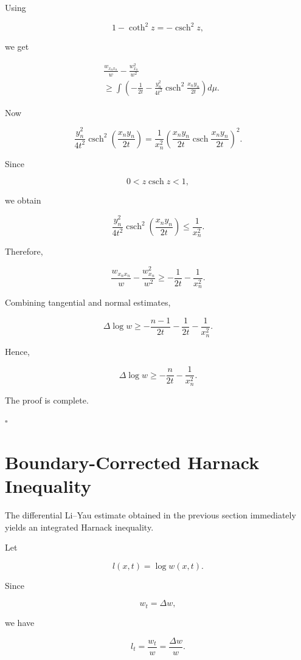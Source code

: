 \documentclass[10pt,a4paper]{amsart}
\DeclareMathOperator{\csch}{csch}
\begin{document}
Using

\[
1-\coth^2 z
=
-\csch^2 z ,
\]

we get

\[
\begin{aligned}
&
\frac{w_{x_nx_n}}w
-
\frac{w_{x_n}^2}{w^2}
\\
&\geq
\int
\left(
-\frac1{2t}
-
\frac{y_n^2}{4t^2}
\csch^2
\frac{x_ny_n}{2t}
\right)d\mu .
\end{aligned}
\]

Now

\[
\frac{y_n^2}{4t^2}
\csch^2
\left(
\frac{x_ny_n}{2t}
\right)
=
\frac1{x_n^2}
\left(
\frac{x_ny_n}{2t}
\csch
\frac{x_ny_n}{2t}
\right)^2 .
\]


Since

\[
0<z\csch z<1,
\]

we obtain

\[
\frac{y_n^2}{4t^2}
\csch^2
\left(
\frac{x_ny_n}{2t}
\right)
\leq
\frac1{x_n^2}.
\]


Therefore,

\[
\frac{w_{x_nx_n}}w
-
\frac{w_{x_n}^2}{w^2}
\geq
-\frac1{2t}
-\frac1{x_n^2}.
\]


Combining tangential and normal estimates,

\[
\Delta\log w
\geq
-\frac{n-1}{2t}
-\frac1{2t}
-\frac1{x_n^2}.
\]

Hence,

\[
\boxed{
\Delta\log w
\geq
-\frac n{2t}
-\frac1{x_n^2}
}.
\]

The proof is complete.

\hfill$\square$


\section{Boundary-Corrected Harnack Inequality}

The differential Li--Yau estimate obtained in the previous section
immediately yields an integrated Harnack inequality.

Let

\[
l(x,t)=\log w(x,t).
\]

Since

\[
w_t=\Delta w,
\]

we have

\[
l_t
=
\frac{w_t}{w}
=
\frac{\Delta w}{w}.
\]
\end{document}
